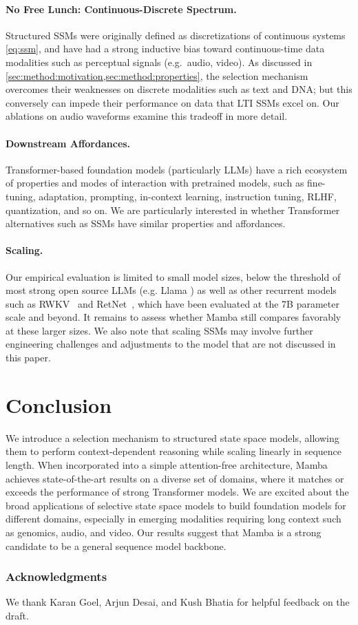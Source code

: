 \paragraph{No Free Lunch: Continuous-Discrete Spectrum.} Structured SSMs were originally defined as discretizations of continuous systems \eqref{eq:ssm},
and have had a strong inductive bias toward continuous-time data modalities such as perceptual signals (e.g.\ audio, video). As discussed in \ref{sec:method:motivation,sec:method:properties}, the selection mechanism overcomes their weaknesses on discrete modalities such as text and DNA; but this conversely can impede their performance on data that LTI SSMs excel on. Our ablations on audio waveforms examine this tradeoff in more detail.

\paragraph{Downstream Affordances.} Transformer-based foundation models (particularly LLMs) have a rich ecosystem of properties and modes of interaction with pretrained models, such as fine-tuning, adaptation, prompting, in-context learning, instruction tuning, RLHF, quantization, and so on. We are particularly interested in whether Transformer alternatives such as SSMs have similar properties and affordances.

\paragraph{Scaling.}
Our empirical evaluation is limited to small model sizes, below the threshold of most strong open source LLMs (e.g. Llama \citep{touvron2023llama})
as well as other recurrent models such as RWKV~\citep{peng2023rwkv} and RetNet~\citep{sun2023retentive},
which have been evaluated at the 7B parameter scale and beyond. It remains to assess whether Mamba still compares favorably at these larger sizes. We also note that scaling SSMs may involve further engineering challenges and adjustments to the model that are not discussed in this paper.

\section{Conclusion}
\label{sec:conclusion}

We introduce a selection mechanism to structured state space models, allowing them to perform context-dependent reasoning while scaling linearly in sequence length. When incorporated into a simple attention-free architecture, Mamba achieves state-of-the-art results on a diverse set of domains, where it matches or exceeds the performance of strong Transformer models. We are excited about the broad applications of selective state space models to build foundation models for different domains, especially in emerging modalities requiring long context such as genomics, audio, and video. Our results suggest that Mamba is a strong candidate to be a general sequence model backbone.

\subsubsection*{Acknowledgments}

We thank Karan Goel, Arjun Desai, and Kush Bhatia for helpful feedback on the draft.

\printbibliography


